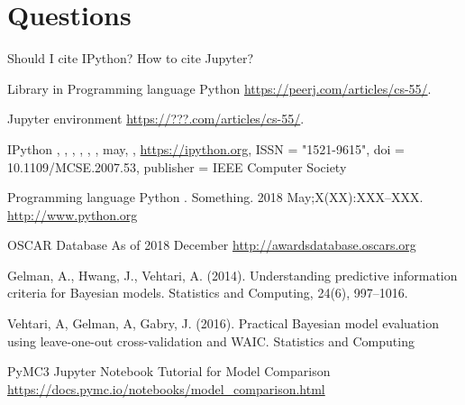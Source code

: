 \documentclass[10pt,letterpaper]{article}
\begin{document}
\section*{Questions}
Should I cite IPython? How to cite Jupyter?

\nolinenumbers

%
%
% 
\begin{thebibliography}{10}

Library in Programming language Python
\newblock \url{https://peerj.com/articles/cs-55/}.

Jupyter environment
\newblock \url{https://???.com/articles/cs-55/}.

IPython 
,
,
,
,
,
,
\newblock may,
,
\newblock \url{https://ipython.org},
\newblock  ISSN      = "1521-9615",
\newblock  doi       = {10.1109/MCSE.2007.53},
\newblock  publisher = {IEEE Computer Society}

Programming language Python
.
\newblock Something. 2018 May;X(XX):XXX--XXX.
\newblock \url{http://www.python.org}

OSCAR Database
\newblock As of 2018 December
\newblock \url{http://awardsdatabase.oscars.org}

\newblock Gelman, A., Hwang, J., Vehtari, A. (2014). Understanding predictive information criteria for Bayesian models. Statistics and Computing, 24(6), 997–1016.

\newblock Vehtari, A, Gelman, A, Gabry, J. (2016). Practical Bayesian model evaluation using leave-one-out cross-validation and WAIC. Statistics and Computing

PyMC3 Jupyter Notebook Tutorial for Model Comparison
\newblock \url{https://docs.pymc.io/notebooks/model_comparison.html}



\end{thebibliography}
\end{document}
